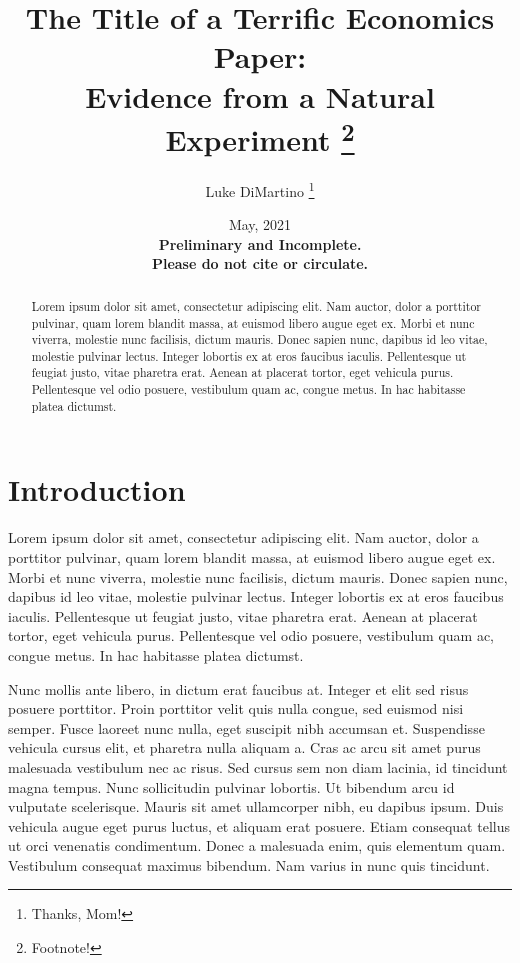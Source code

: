 \documentclass[12pt]{article}
\title{ \vspace*{-2.5cm} \hspace*{-0.5cm}The Title of a Terrific Economics Paper: \\ Evidence from a Natural Experiment
	\footnote{Footnote!}
}}
\author{Luke DiMartino \thanks{Thanks, Mom!}}
\date{ \vspace*{0.5cm} May, 2021\\
\textbf{Preliminary and Incomplete. \\ Please do not cite or circulate.}
}
\begin{document}
\bgroup
\let\footnoterule\relax

\begin{singlespace}
\maketitle


\begin{abstract}
    \noindent Lorem ipsum dolor sit amet, consectetur adipiscing elit. Nam auctor, dolor a porttitor pulvinar, quam lorem blandit massa, at euismod libero augue eget ex. Morbi et nunc viverra, molestie nunc facilisis, dictum mauris. Donec sapien nunc, dapibus id leo vitae, molestie pulvinar lectus. Integer lobortis ex at eros faucibus iaculis. Pellentesque ut feugiat justo, vitae pharetra erat. Aenean at placerat tortor, eget vehicula purus. Pellentesque vel odio posuere, vestibulum quam ac, congue metus. In hac habitasse platea dictumst.
\end{abstract}
\end{singlespace}
\thispagestyle{empty}

\clearpage
\egroup
\setcounter{page}{1}


\section{Introduction\label{sec:introduction}}

\noindent Lorem ipsum dolor sit amet, consectetur adipiscing elit. Nam auctor, dolor a porttitor pulvinar, quam lorem blandit massa, at euismod libero augue eget ex. Morbi et nunc viverra, molestie nunc facilisis, dictum mauris. Donec sapien nunc, dapibus id leo vitae, molestie pulvinar lectus. Integer lobortis ex at eros faucibus iaculis. Pellentesque ut feugiat justo, vitae pharetra erat. Aenean at placerat tortor, eget vehicula purus. Pellentesque vel odio posuere, vestibulum quam ac, congue metus. In hac habitasse platea dictumst.

Nunc mollis ante libero, in dictum erat faucibus at. Integer et elit sed risus posuere porttitor. Proin porttitor velit quis nulla congue, sed euismod nisi semper. Fusce laoreet nunc nulla, eget suscipit nibh accumsan et. Suspendisse vehicula cursus elit, et pharetra nulla aliquam a. Cras ac arcu sit amet purus malesuada vestibulum nec ac risus. Sed cursus sem non diam lacinia, id tincidunt magna tempus. Nunc sollicitudin pulvinar lobortis. Ut bibendum arcu id vulputate scelerisque. Mauris sit amet ullamcorper nibh, eu dapibus ipsum. Duis vehicula augue eget purus luctus, et aliquam erat posuere. Etiam consequat tellus ut orci venenatis condimentum. Donec a malesuada enim, quis elementum quam. Vestibulum consequat maximus bibendum. Nam varius in nunc quis tincidunt.
\end{document}
